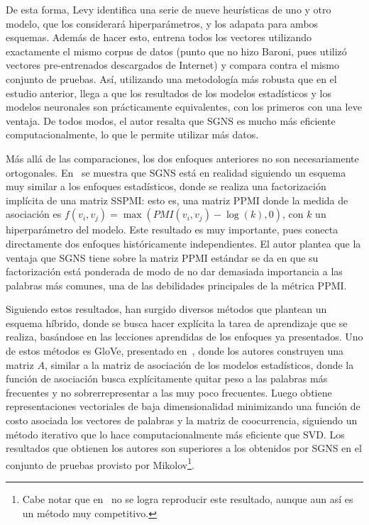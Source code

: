 De esta forma, Levy identifica una serie de nueve heurísticas de uno y otro modelo, que los
considerará hiperparámetros, y los adapata para ambos esquemas. Además de hacer esto, entrena todos
los vectores utilizando exactamente el mismo corpus de datos (punto que no hizo Baroni, pues utilizó
vectores pre-entrenados descargados de Internet) y compara contra el mismo conjunto de pruebas. Así,
utilizando una metodología más robusta que en el estudio anterior, llega a que los resultados de los
modelos estadísticos y los modelos neuronales son prácticamente equivalentes, con los primeros con
una leve ventaja. De todos modos, el autor resalta que SGNS es mucho más eficiente
computacionalmente, lo que le permite utilizar más datos.


Más allá de las comparaciones, los dos enfoques anteriores no son necesariamente
ortogonales. En~\cite{Levy2014a} se muestra que SGNS está en realidad siguiendo un esquema muy
similar a los enfoques estadísticos, donde se realiza una factorización implícita de una matriz
SSPMI\@: esto es, una matriz PPMI donde la medida de asociación es $f(v_i, v_j) = \max(PMI(v_i, v_j)
- \log(k), 0)$, con $k$ un hiperparámetro del modelo. Este resultado es muy importante, pues conecta
directamente dos enfoques históricamente independientes. El autor plantea que la ventaja que SGNS
tiene sobre la matriz PPMI estándar se da en que su factorización está ponderada de modo de no dar
demasiada importancia a las palabras más comunes, una de las debilidades principales de la métrica
PPMI\@.


Siguiendo estos resultados, han surgido diversos métodos que plantean un esquema híbrido, donde se
busca hacer explícita la tarea de aprendizaje que se realiza, basándose en las lecciones aprendidas
de los enfoques ya presentados. Uno de estos métodos es GloVe, presentado en~\cite{Pennington2014},
donde los autores construyen una matriz $A$, similar a la matriz de asociación de los modelos
estadísticos, donde la función de asociación busca explícitamente quitar peso a las palabras más
frecuentes y no sobrerrepresentar a las muy poco frecuentes. Luego obtiene representaciones
vectoriales de baja dimensionalidad minimizando una función de costo asociada los vectores de
palabras y la matriz de coocurrencia, siguiendo un método iterativo que lo hace computacionalmente
más eficiente que SVD\@. Los resultados que obtienen los autores son superiores a los obtenidos por
SGNS en el conjunto de pruebas provisto por Mikolov\footnote{Cabe notar que en~\cite{Levy2015} no se
logra reproducir este resultado, aunque aun así es un método muy competitivo.}.


